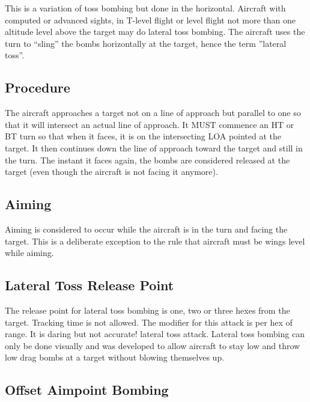 \begin{advancedrules}
    This is a variation of toss bombing but done in the horizontal. Aircraft with computed or advanced sights, in T-level flight or level flight not more than one altitude level above the target may do lateral toss bombing. The aircraft uses the turn to “sling” the bombs horizontally at the target, hence the term ”lateral toss”.

    \subsection{Procedure} The aircraft approaches a target not on a line of approach but parallel to one so that it will intersect an actual line of approach. It MUST commence an HT or BT turn so that when it faces, it is on the intersecting LOA pointed at the target. It then continues down the line of approach toward the target and still in the turn. The instant it faces again, the bombs are considered released at the target (even though the aircraft is not facing it anymore).

    \subsection{Aiming} Aiming is considered to occur while the aircraft is in the turn and facing the target. This is a deliberate exception to the rule that aircraft must be wings level while aiming.

    \subsection{Lateral Toss Release Point}
    The release point for lateral toss bombing is one, two or three hexes from the target. Tracking time is not allowed. The modifier for this attack is  per hex of range. It is daring but not accurate!  lateral toss attack. Lateral toss bombing can only be done visually and was developed to allow aircraft to stay low and throw low drag bombs at a target without blowing themselves up.

    \subsection{Offset Aimpoint Bombing}
    \label{rule:offset-aimpoint-bombing}


\end{advancedrules}
